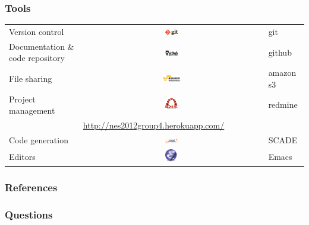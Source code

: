 \documentclass{beamer}
\theoremstyle{definition} \newtheorem{mdefinition}{Definition}
\theoremstyle{plain} \newtheorem{mtheorem}{Theorem}
\theoremstyle{plain} \newtheorem{mcorollary}{Corollary}
\theoremstyle{plain} \newtheorem{mfact}{Fact}
\begin{document}
\begin{frame}
	\frametitle{Tools}

\begin{tabular}{lcl}

Version control & \includegraphics[width=0.07\textwidth]{img/gitlogo} & git\\
Documentation \& code repository & \includegraphics[width=0.07\textwidth]{img/github-logo} & github\\
File sharing & \includegraphics[width=0.1\textwidth]{img/aws-logo} & amazon s3\\
Project management & \includegraphics[width=0.07\textwidth]{img/redmine-logo} & redmine\\
		& \multicolumn{2}{l}{\tiny{\href{http://nes2012group4.herokuapp.com/}{http://nes2012group4.herokuapp.com/}}}\\
Code generation & \includegraphics[width=0.07\textwidth]{img/scade-logo} & SCADE\\
Editors & \includegraphics[width=0.07\textwidth]{img/emacs-logo} & Emacs\\

\end{tabular}

\end{frame}


\begin{frame}
	\frametitle{References}
	
	

\end{frame}


\begin{frame}
	\frametitle{Questions}

\end{frame}
\end{document}
